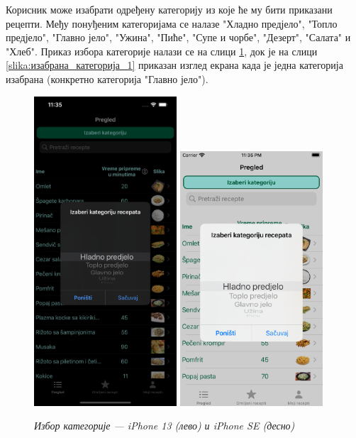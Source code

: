 \documentclass[12pt,oneside]{memoir}
\begin{document}
\indent Корисник може изабрати одређену категорију из које ће му бити приказани рецепти. Међу понуђеним категоријама се налазе "Хладно предјело", "Топло предјело", "Главно јело", "Ужина", "Пиће", "Супе и чорбе", "Дезерт", "Салата" и "Хлеб". Приказ избора категорије налази се на слици \ref{slika:категорија_1}, док је на слици \ref{slika:изабрана_категорија_1} приказан изглед екрана када је једна категорија изабрана (конкретно категорија "Главно јело").

\begin{figure} [H]
    \centering
    \captionsetup{justification=centering}
    \includegraphics[width=0.475\textwidth]{images/simulators/view images/dark - category.png} 
    \hfill
    \includegraphics[width=0.475\textwidth]{images/simulators/view images/light - category.png}
    \caption{\textit{Избор категорије --- iPhone 13 (лево) и iPhone SE (десно)}}
    \label{slika:категорија_1}
\end{figure}
\end{document}
